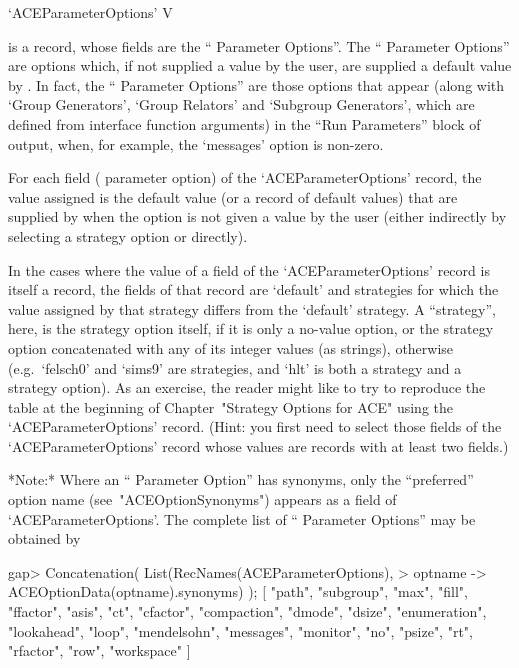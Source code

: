 \>`ACEParameterOptions' V

is a {\GAP} record, whose fields are the ``{\ACE} Parameter Options''.
The ``{\ACE} Parameter Options'' are options which, if not supplied  a
value by the user, are supplied a default value by  {\ACE}.  In  fact,
the ``{\ACE} Parameter Options'' are those options that appear  (along
with `Group Generators', `Group Relators' and  `Subgroup  Generators',
which are defined from {\ACE} interface  function  arguments)  in  the
``Run Parameters'' block of {\ACE}  output,  when,  for  example,  the
`messages' option is non-zero.

For each field ({\ACE} parameter option) of the  `ACEParameterOptions'
record, the value assigned is  the  default  value  (or  a  record  of
default values) that are supplied by {\ACE} when  the  option  is  not
given a value by the user (either indirectly by selecting  a  strategy
option or directly).

In the cases where the value of a field of  the  `ACEParameterOptions'
record is itself a record, the fields of that record are `default' and
strategies for which the value assigned by that strategy differs  from
the `default' strategy. A ``strategy'', here, is the  strategy  option
itself, if it is only  a  no-value  option,  or  the  strategy  option
concatenated with any of its integer values  (as  strings),  otherwise
(e.g.~`felsch0' and `sims9'  are  strategies,  and  `hlt'  is  both  a
strategy and a strategy option). As an exercise, the reader might like
to try to reproduce the table at the  beginning  of  Chapter~"Strategy
Options for ACE" using the `ACEParameterOptions'  record.  (Hint:  you
first need to select those fields of the `ACEParameterOptions'  record
whose values are records with at least two fields.)

*Note:*
Where  an  ``{\ACE}  Parameter  Option''  has   synonyms,   only   the
``preferred'' option name (see~"ACEOptionSynonyms") appears as a field
of `ACEParameterOptions'. The  complete  list  of  ``{\ACE}  Parameter
Options'' may be obtained by

\beginexample
gap> Concatenation( List(RecNames(ACEParameterOptions),
>                        optname -> ACEOptionData(optname).synonyms) );
[ "path", "subgroup", "max", "fill", "ffactor", "asis", "ct",
  "cfactor", "compaction", "dmode", "dsize", "enumeration",
  "lookahead", "loop", "mendelsohn", "messages", "monitor", "no",
  "psize", "rt", "rfactor", "row", "workspace" ]

\endexample

